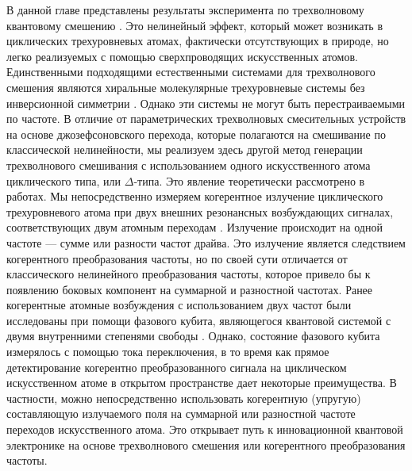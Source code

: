 В данной главе представлены результаты эксперимента по трехволновому квантовому смешению \cite{liu2014controllable}. Это нелинейный эффект, который может возникать в циклических трехуровневых атомах, фактически отсутствующих в природе, но легко реализуемых с помощью сверхпроводящих искусственных атомов. Единственными подходящими естественными системами для трехволнового смешения являются хиральные молекулярные трехуровневые системы без инверсионной симметрии \cite{PhysRevLett.111.023008}. Однако эти системы не могут быть перестраиваемыми по частоте. В отличие от параметрических трехволновых смесительных устройств на основе джозефсоновского перехода, которые полагаются на смешивание по классической нелинейности, мы реализуем здесь другой метод генерации трехволнового смешивания с использованием одного искусственного атома циклического типа, или $\Delta$-типа. Это явление теоретически рассмотрено в работах. Мы непосредственно измеряем когерентное излучение циклического трехуровневого атома при двух внешних резонансных возбуждающих сигналах, соответствующих двум атомным переходам \cite{PhysRevA.98.041801}. Излучение происходит на одной частоте --- сумме или разности частот драйва. Это излучение является следствием когерентного преобразования частоты, но по своей сути отличается от классического нелинейного преобразования частоты, которое привело бы к появлению боковых компонент на суммарной и разностной частотах. Ранее когерентные атомные возбуждения с использованием двух частот были исследованы при помощи фазового кубита, являющегося квантовой системой с двумя внутренними степенями свободы \cite{Lecocq2012}. Однако, состояние фазового кубита измерялось с помощью тока переключения, в то время как прямое детектирование когерентно преобразованного сигнала на циклическом искусственном атоме в открытом пространстве дает некоторые преимущества. В частности, можно непосредственно использовать когерентную (упругую) составляющую излучаемого поля на суммарной или разностной частоте переходов искусственного атома. Это открывает путь к инновационной квантовой электронике на основе трехволнового смешения или когерентного преобразования частоты.
